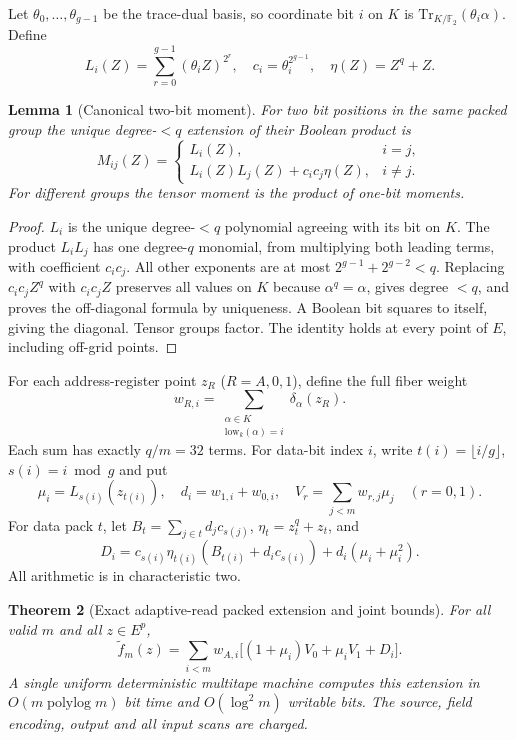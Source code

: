 \documentclass[11pt]{article}
\newtheorem{theorem}{Theorem}
\newtheorem{lemma}[theorem]{Lemma}
\begin{document}
Let $\theta_0,\dots,\theta_{g-1}$ be the trace-dual basis, so coordinate bit $i$ on $K$ is $\mathrm{Tr}_{K/\mathbb F_2}(\theta_i\alpha)$. Define
\[
 L_i(Z)=\sum_{r=0}^{g-1}(\theta_i Z)^{2^r},\quad c_i=\theta_i^{2^{g-1}},\quad \eta(Z)=Z^q+Z.
\]
\begin{lemma}[Canonical two-bit moment]\label{lem:pair}
For two bit positions in the same packed group the unique degree-$<q$ extension of their Boolean product is
\[
 M_{ij}(Z)=
 \begin{cases}
 L_i(Z),&i=j,\\
 L_i(Z)L_j(Z)+c_ic_j\eta(Z),&i\ne j.
 \end{cases}
\]
For different groups the tensor moment is the product of one-bit moments.
\end{lemma}
\begin{proof}
$L_i$ is the unique degree-$<q$ polynomial agreeing with its bit on $K$. The product $L_iL_j$ has one degree-$q$ monomial, from multiplying both leading terms, with coefficient $c_ic_j$. All other exponents are at most $2^{g-1}+2^{g-2}<q$. Replacing $c_ic_jZ^q$ with $c_ic_jZ$ preserves all values on $K$ because $\alpha^q=\alpha$, gives degree $<q$, and proves the off-diagonal formula by uniqueness. A Boolean bit squares to itself, giving the diagonal. Tensor groups factor. The identity holds at every point of $E$, including off-grid points.
\end{proof}
For each address-register point $z_R$ ($R=A,0,1$), define the full fiber weight
\[
 w_{R,i}=\sum_{\substack{\alpha\in K\\\mathrm{low}_k(\alpha)=i}}\delta_\alpha(z_R).
\]
Each sum has exactly $q/m=32$ terms. For data-bit index $i$, write $t(i)=\lfloor i/g\rfloor$, $s(i)=i\bmod g$ and put
\[
 \mu_i=L_{s(i)}(z_{t(i)}),\quad d_i=w_{1,i}+w_{0,i},\quad
 V_r=\sum_{j<m}w_{r,j}\mu_j\quad(r=0,1).
\]
For data pack $t$, let $B_t=\sum_{j\in t}d_jc_{s(j)}$, $\eta_t=z_t^q+z_t$, and
\[
 D_i=c_{s(i)}\eta_{t(i)}(B_{t(i)}+d_ic_{s(i)})
       +d_i(\mu_i+\mu_i^2).
\]
All arithmetic is in characteristic two.
\begin{theorem}[Exact adaptive-read packed extension and joint bounds]
For all valid $m$ and all $z\in E^p$,
\[
\boxed{\displaystyle
\widetilde f_m(z)=\sum_{i<m}w_{A,i}
\big[(1+\mu_i)V_0+\mu_iV_1+D_i\big].}
\]
A single uniform deterministic multitape machine computes this extension in $O(m\operatorname{polylog}m)$ bit time and $O(\log^2m)$ writable bits. The source, field encoding, output and all input scans are charged.
\end{theorem}
\end{document}
